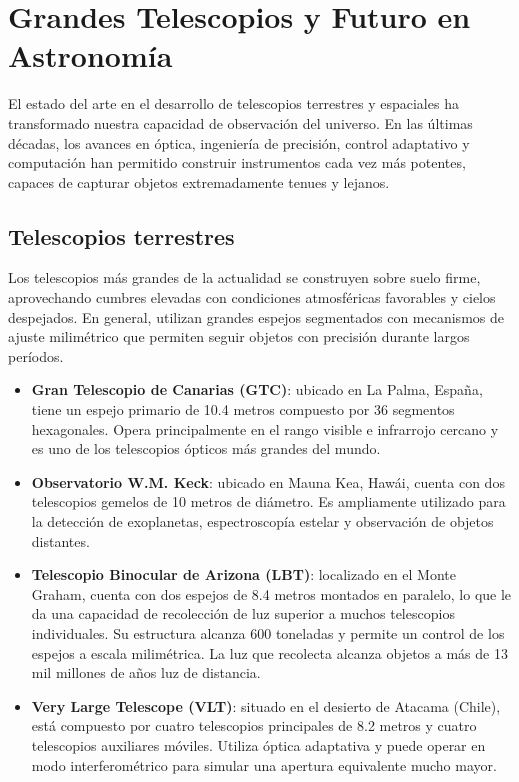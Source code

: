 \section{Grandes Telescopios y Futuro en Astronomía}

El estado del arte en el desarrollo de telescopios terrestres y espaciales ha transformado nuestra capacidad de observación del universo. En las últimas décadas, los avances en óptica, ingeniería de precisión, control adaptativo y computación han permitido construir instrumentos cada vez más potentes, capaces de capturar objetos extremadamente tenues y lejanos.

\subsection*{Telescopios terrestres}

Los telescopios más grandes de la actualidad se construyen sobre suelo firme, aprovechando cumbres elevadas con condiciones atmosféricas favorables y cielos despejados. En general, utilizan grandes espejos segmentados con mecanismos de ajuste milimétrico que permiten seguir objetos con precisión durante largos períodos.

\begin{itemize}
	\item \textbf{Gran Telescopio de Canarias (GTC)}: ubicado en La Palma, España, tiene un espejo primario de 10.4 metros compuesto por 36 segmentos hexagonales. Opera principalmente en el rango visible e infrarrojo cercano y es uno de los telescopios ópticos más grandes del mundo.
	
	\item \textbf{Observatorio W.M. Keck}: ubicado en Mauna Kea, Hawái, cuenta con dos telescopios gemelos de 10 metros de diámetro. Es ampliamente utilizado para la detección de exoplanetas, espectroscopía estelar y observación de objetos distantes.
	
	\item \textbf{Telescopio Binocular de Arizona (LBT)}: localizado en el Monte Graham, cuenta con dos espejos de 8.4 metros montados en paralelo, lo que le da una capacidad de recolección de luz superior a muchos telescopios individuales. Su estructura alcanza 600 toneladas y permite un control de los espejos a escala milimétrica. La luz que recolecta alcanza objetos a más de 13 mil millones de años luz de distancia.
	
	\item \textbf{Very Large Telescope (VLT)}: situado en el desierto de Atacama (Chile), está compuesto por cuatro telescopios principales de 8.2 metros y cuatro telescopios auxiliares móviles. Utiliza óptica adaptativa y puede operar en modo interferométrico para simular una apertura equivalente mucho mayor.
\end{itemize}

